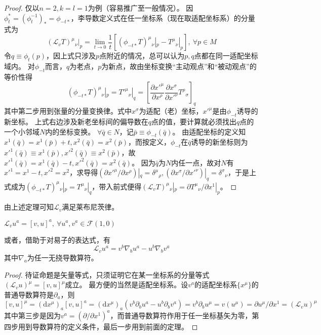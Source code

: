\begin{proof}
仅以$n = 2, k = l = 1$为例（容易推广至一般情况）。
因$\phi_t^* = (\phi_t^{-1})_* = \phi_{-t*}$，李导数定义式在任一坐标系（现在取适配坐标系）的分量式为
$$(\mathscr{L}_vT)^{\mu}{}_{\nu}|_p = \lim\limits_{t \to 0}\frac{1}{t}[(\phi_{-t*}T)^{\mu}{}_{\nu}|_p - T^{\mu}{}_{\nu}|_p], ~ \forall p \in M$$
令$q \equiv \phi_t(p)$，因上式只涉及$p$点附近的情况，总可以认为$p, q$点都在同一适配坐标域内。
对$\phi_{-t}$而言，$q$为老点，$p$为新点，故由坐标变换``主动观点''和``被动观点''的等价性得
$$(\phi_{-t*}T)^{\mu}{}_{\nu}|_p = T'^{\mu}{}_{\nu}|_q = \left[\frac{\partial x'^{\mu}}{\partial x^{\rho}}\frac{\partial x^{\sigma}}{\partial x'^{\nu}}T^{\rho}{}_{\sigma}\right]_q$$
其中第二步用到张量的分量变换律。式中$x^{\sigma}$为适配（老）坐标，$x'^{\mu}$是由$\phi_{-t}$诱导的新坐标。
上式右边涉及新老坐标间的偏导数在$q$点的值，要计算就必须找出$q$点的一个小邻域$N$内的坐标变换。
$\forall \bar{q} \in N$，记$\bar{p} \equiv \phi_{-t}(\bar{q})$。
由适配坐标的定义知$x^1(\bar{q}) = x^1(\bar{p}) + t, x^2(\bar{q}) = x^2(\bar{p})$，而按定义，$\phi_{-t}$在$\bar{q}$诱导的新坐标则为$x'^1(\bar{q}) \equiv x^1(\bar{p}), x'^2(\bar{q}) \equiv x^2(\bar{p})$，故$x'^1(\bar{q}) = x^1(\bar{q}) - t, x'^2(\bar{q}) = x^2(\bar{q})$。
因为$\bar{q}$为$N$内任一点，故对$N$有$x'^1 = x^1 - t, x'^2 = x^2$，求导得$(\partial x'^{\mu} / \partial x^{\rho})|_q = \delta^{\mu}{}_{\rho}, (\partial x^{\sigma} / \partial x'^{\nu})|_q = \delta^{\sigma}{}_{\nu}$，于是上式成为$(\phi_{-t*}T)^{\mu}{}_{\nu}|_p = T^{\mu}{}_{\nu}|_q$，带入前式便得$(\mathscr{L}_vT)^{\mu}{}_{\nu}|_p = \partial T^{\mu}{}_{\nu} / \partial x^1|_p$。
\end{proof}

由上述定理可知$\mathscr{L}_v$满足莱布尼茨律。

\begin{theorem}
$\mathscr{L}_vu^a = [v, u]^a, ~ \forall u^a, v^a \in \mathscr{F}(1, 0)$

或者，借助于对易子的表达式，有
$$\mathscr{L}_vu^a = v^b\nabla_bu^a - u^b\nabla_bv^a$$
其中$\nabla_a$为任一无挠导数算符。
\end{theorem}

\begin{proof}
待证命题是矢量等式，只须证明它在某一坐标系的分量等式$(\mathscr{L}_vu)^{\mu} = [v, u]^{\mu}$成立。
最方便的当然是适配坐标系。设$v^a$的适配坐标系$\{x^\mu\}$的普通导数算符是$\partial_a$，则
$$[v, u]^\mu = (\mathrm{d}x^\mu)_a[v, u]^a = (\mathrm{d}x^\mu)_a(v^b\partial_bu^a - u^b\partial_bv^a) = v^b\partial_bu^\mu = v(u^\mu) = \partial u^\mu / \partial x^1 = (\mathscr{L}_vu)^\mu$$
其中第三步是因为$v^a = (\partial / \partial x^1)^a$，而普通导数算符作用于任一坐标基矢为零，第四步用到导数算符的定义条件，最后一步用到前面的定理。
\end{proof}

